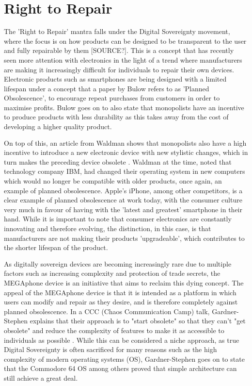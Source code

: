 

\section{Right to Repair}

The 'Right to Repair' mantra falls under the Digital Sovereignty movement, where the focus is on how products can be designed to be transparent to the user and fully repairable by them [SOURCE?].
This is a concept that has recently seen more attention with electronics in the light of a trend where manufacturers are making it increasingly difficult for individuals to repair their own devices.
Electronic products such as smartphones are being designed with a limited lifespan under a concept that a paper by Bulow \cite{obsolescence} refers to as 'Planned Obsolescence', to encourage repeat purchases from customers in order to maximise profits.
Bulow goes on to also state that monopolists have an incentive to produce products with less durability as this takes away from the cost of developing a higher quality product.

On top of this, an article from Waldman shows that monopolists also have a high incentive to introduce a new electronic device with new stylistic changes, which in turn makes the preceding device obsolete \cite{obsolescence2}.
Waldman at the time, noted that technology company IBM, had changed their operating system in new computers which would no longer be compatible with older products, once again, an example of planned obsolescence.
Apple's iPhone, among other competitors, is a clear example of planned obsolescence at work today, with the consumer culture very much in favour of having with the 'latest and greatest' smartphone in their hand.
While it is important to note that consumer electronics are constantly innovating and therefore evolving, the distinction, in this case, is that manufacturers are not making their products 'upgradeable', which contributes to the shorter lifespan of the product.

As digitally sovereign devices are becoming increasingly rare due to multiple factors such as increasing complexity and protection of trade secrets, the MEGAphone device is an initiative that aims to reclaim this dying concept. %
The appeal of the MEGAphone device is that it is intended as a platform in which users can modify and repair as they desire, and is therefore completely against planned obsolescence.
In a CCC (Chaos Communication Camp) talk, Gardner-Stephen explains that their approach is to "start obsolete" so that they can't "get obsolete" and reduce the complexity of features to make it as accessible to individuals as possible \cite{mobilehistory}.
While this can be considered a niche approach, as true Digital Sovereignty is often sacrificed for many reasons such as the high complexity of modern operating systems (OS), Gardner-Stephen goes on to state that the Commodore 64 OS among others proved that simple architecture can still achieve a great deal.

